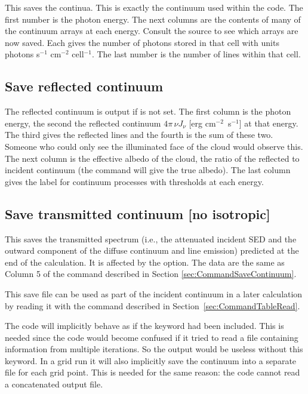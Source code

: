 This saves the  continua.
This is exactly the continuum used
within the code.  The first number is the photon energy.  The next columns
are the contents of many of the continuum arrays at each energy.  Consult
the source to see which arrays are now saved.  Each gives the number of
photons stored in that cell with units photons s$^{-1}$ cm$^{-2}$
cell$^{-1}$.  The last
number is the number of lines within that cell.

\subsection{Save reflected continuum}

The reflected continuum is output if  is not set.  The first column
is the photon energy, the second the reflected continuum $4\pi \,\nu J_\nu
$ [erg  cm$^{-2}$~s$^{-1}$] at that energy.  The third gives the reflected lines
and the fourth is the sum of these two.  Someone who could only see the
illuminated face of the cloud would observe this.  The next column is the
effective albedo of the cloud, the ratio of the reflected to incident
continuum (the  command will give the
true albedo).  The last column gives the label
for continuum processes with thresholds at each energy.

\subsection{Save transmitted continuum [no isotropic]}
\label{sec:CommandSaveTransmittedContinuum}

This saves the transmitted spectrum (i.e., the attenuated incident SED and the outward component
of the diffuse continuum and line emission) predicted at the end of the calculation.
It is affected by the  option.
The data are the same as Column 5 of the 
command described in Section \ref{sec:CommandSaveContinuum}.

This save file can be used as part of the incident continuum in a later
calculation by reading it with the  command described in
Section~\ref{sec:CommandTableRead}.

The code will implicitly behave as if the keyword  had been
included. This is needed since the code would become confused if it tried to
read a file containing information from multiple iterations. So the output
would be useless without this keyword. In a grid run it will also implicitly
save the continuum into a separate file for each grid point. This is needed
for the same reason: the code cannot read a concatenated output file.

